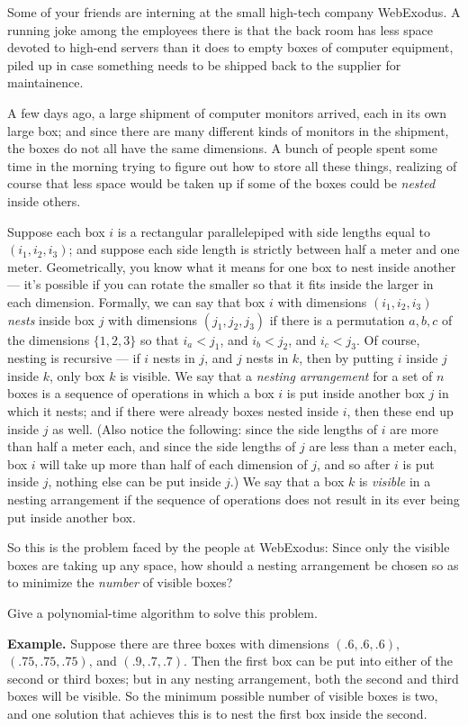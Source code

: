 \documentclass[11pt]{article}
\theoremstyle{numberplain}
\theoremstyle{nonumberplain}
\newcommand{\0}{{\mathbf{0}}}
\begin{document}
\begin{ques}[HW6, 7-31] Some of your friends are interning at the small high-tech company WebExodus.
A running joke among the employees there is that the back room
has less space devoted to high-end servers than it does to
empty boxes of computer equipment, piled up in case something
needs to be shipped back to the supplier for maintainence.

A few days ago, a large shipment of computer monitors
arrived, each in its own large box;
and since there are many different kinds of monitors
in the shipment, the boxes do not all have the same dimensions.
A bunch of people spent some time in the morning
trying to figure out how to store all these things,
realizing of course that less space would be taken up if
some of the boxes could be {\em nested} inside others.

Suppose each box $i$ is a rectangular parallelepiped
with side lengths equal to $(i_1, i_2, i_3)$;
and suppose each side length is strictly between half a meter and one meter.
Geometrically, you know what it means for one box
to nest inside another --- it's possible if you can rotate the
smaller so that it fits inside the larger in each dimension.
Formally, we can say that box $i$ with dimensions $(i_1, i_2, i_3)$
{\em nests} inside box $j$ with dimensions $(j_1, j_2, j_3)$ if
there is a permutation $a, b, c$ of the dimensions $\{1, 2, 3\}$
so that $i_a < j_1$, and $i_b < j_2$, and $i_c < j_3$.
Of course, nesting is recursive --- if $i$ nests in $j$,
and $j$ nests in $k$, then by putting $i$ inside $j$ inside $k$,
only box $k$ is visible.
We say that a {\em nesting arrangement} for a set
of $n$ boxes is a sequence of operations in which
a box $i$ is put inside another box $j$ in which it nests;
and if there were already boxes nested inside $i$,
then these end up inside $j$ as well.
(Also notice the following:
since the side lengths of $i$ are more than half a meter each,
and since the side lengths of $j$ are less than a meter each,
box $i$ will take up more than half of each dimension of $j$,
and so after $i$ is put inside $j$, nothing else can be put inside $j$.)
We say that a box $k$ is {\em visible} in a nesting
arrangement if the sequence of operations does not
result in its ever being put inside another box.

So this is the problem faced by the people at WebExodus:
Since only the visible boxes are taking up any space,
how should a nesting arrangement be chosen
so as to minimize the {\em number} of visible boxes?

Give a polynomial-time algorithm to solve this problem.

\smallskip
{\bf Example.} Suppose there are three boxes with dimensions
$(.6, .6, .6)$, $(.75, .75, .75)$, and $(.9, .7, .7)$.
Then the first box can be put into either of the second
or third boxes;
but in any nesting arrangement, both the
second and third boxes will be visible.
So the minimum possible number of visible boxes is two,
and one solution that achieves this is to
nest the first box inside the second.

\end{ques}
\end{document}
